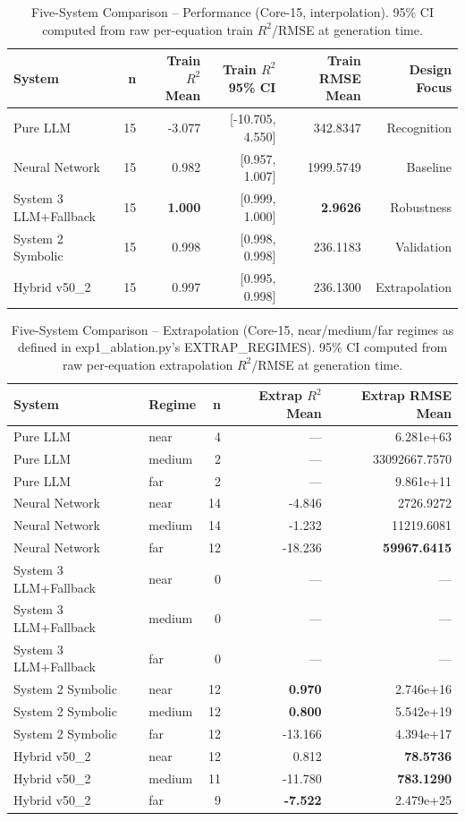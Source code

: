 \documentclass[twoside,11pt]{article}
\begin{document}
\begin{table}[t]
\centering
\caption{Five-System Comparison -- Performance (Core-15, interpolation).
  95\% CI computed from raw per-equation train $R^2$/RMSE at generation time.}
\label{tab:five_systems_performance}
\begin{tabular}{lrrrrr}
\toprule
\textbf{System} & \textbf{n} & \textbf{Train $R^2$ Mean}
  & \textbf{Train $R^2$ 95\% CI} & \textbf{Train RMSE Mean}
  & \textbf{Design Focus} \\
\midrule
Pure LLM & 15 & -3.077 & [-10.705, 4.550] & 342.8347 & Recognition \\
Neural Network & 15 & 0.982 & [0.957, 1.007] & 1999.5749 & Baseline \\
System 3 LLM+Fallback & 15 & \textbf{1.000} & [0.999, 1.000] & \textbf{2.9626} & Robustness \\
System 2 Symbolic & 15 & 0.998 & [0.998, 0.998] & 236.1183 & Validation \\
Hybrid v50\_2 & 15 & 0.997 & [0.995, 0.998] & 236.1300 & Extrapolation \\
\bottomrule
\end{tabular}
\end{table}

\begin{table}[t]
\centering
\caption{Five-System Comparison -- Extrapolation (Core-15, near/medium/far
  regimes as defined in exp1\_ablation.py's EXTRAP\_REGIMES).
  95\% CI computed from raw per-equation extrapolation $R^2$/RMSE at
  generation time.}
\label{tab:five_systems_extrapolation}
\begin{tabular}{llrrr}
\toprule
\textbf{System} & \textbf{Regime} & \textbf{n}
  & \textbf{Extrap $R^2$ Mean} & \textbf{Extrap RMSE Mean} \\
\midrule
Pure LLM & near & 4 & --- & 6.281e+63 \\
Pure LLM & medium & 2 & --- & 33092667.7570 \\
Pure LLM & far & 2 & --- & 9.861e+11 \\
Neural Network & near & 14 & -4.846 & 2726.9272 \\
Neural Network & medium & 14 & -1.232 & 11219.6081 \\
Neural Network & far & 12 & -18.236 & \textbf{59967.6415} \\
System 3 LLM+Fallback & near & 0 & --- & --- \\
System 3 LLM+Fallback & medium & 0 & --- & --- \\
System 3 LLM+Fallback & far & 0 & --- & --- \\
System 2 Symbolic & near & 12 & \textbf{0.970} & 2.746e+16 \\
System 2 Symbolic & medium & 12 & \textbf{0.800} & 5.542e+19 \\
System 2 Symbolic & far & 12 & -13.166 & 4.394e+17 \\
Hybrid v50\_2 & near & 12 & 0.812 & \textbf{78.5736} \\
Hybrid v50\_2 & medium & 11 & -11.780 & \textbf{783.1290} \\
Hybrid v50\_2 & far & 9 & \textbf{-7.522} & 2.479e+25 \\
\bottomrule
\end{tabular}
\end{table}
\end{document}
